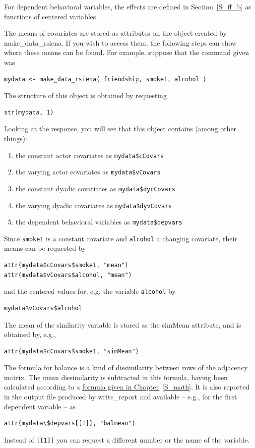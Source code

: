 \documentclass[a4paper,fleqn,11pt]{article}
\newcommand{\+}{\, + \,}
\newcommand{\sfn}[1]{\textsf{#1}}
\begin{document}
For dependent behavioral variables, the effects are defined
in Section~\ref{S_ff_b} as functions of centered variables.

The means of covariates are stored as attributes on the object created by
\textsf{make\_data\_rsiena}.
If you wish to access them, the following steps can show
where these means can be found.
For example, suppose that the command given was
\begin{verbatim}
mydata <- make_data_rsiena( friendship, smoke1, alcohol )
\end{verbatim}
The structure of this object is obtained by requesting
\begin{verbatim}
str(mydata, 1)
\end{verbatim}
Looking at the response, you
will see that this object contains (among other things):
\begin{enumerate}
\item the constant actor covariates as \texttt{mydata\$cCovars}
\item the varying actor covariates as \texttt{mydata\$vCovars}
\item the constant dyadic covariates as \texttt{mydata\$dycCovars}
\item the varying dyadic covariates as \texttt{mydata\$dyvCovars}
\item the dependent behavioral variables as \texttt{mydata\$depvars}
\end{enumerate}
Since \texttt{smoke1} is a constant covariate and \texttt{alcohol}
a changing covariate, their means can be requested by
\begin{verbatim}
attr(mydata$cCovars$smoke1, "mean")
attr(mydata$vCovars$alcohol, "mean")
\end{verbatim}
and the centered values for, e.g, the variable \texttt{alcohol} by
\begin{verbatim}
mydata$vCovars$alcohol
\end{verbatim}
The mean of the similarity variable is stored as the \sfn{simMean} attribute,
and is obtained by, e.g.,
\begin{verbatim}
attr(mydata$cCovars$smoke1, "simMean")
\end{verbatim}

The formula for balance is a kind of dissimilarity between rows of
the adjacency matrix. The mean dissimilarity is subtracted in this
formula, having been calculated according to a
\hyperlink{T_meanbal}{formula given in Chapter}~\ref{S_math}.
It is also reported in the
 output file produced by \sfn{write\_report} and available -- e.g., for the first
dependent variable -- as
\begin{verbatim}
attr(mydata\$depvars[[1]], "balmean")
\end{verbatim}
Instead of \texttt{[[1]]} you can request a different number or
the name of the variable.
\smallskip
\end{document}
